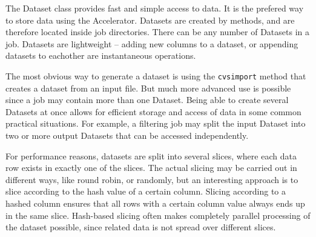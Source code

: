 
\label{chap:datasets}

The Dataset class provides fast and simple access to data.  It is the
prefered way to store data using the Accelerator.  Datasets are
created by methods, and are therefore located inside job directories.
There can be any number of Datasets in a job.  Datasets are
lightweight -- adding new columns to a dataset, or appending datasets
to eachother are instantaneous operations.

The most obvious way to generate a dataset is using the
\texttt{cvsimport} method that creates a dataset from an input file.
But much more advanced use is possible since a job may contain more
than one Dataset.  Being able to create several Datasets at once
allows for efficient storage and access of data in some common
practical situations.  For example, a filtering job may split the
input Dataset into two or more output Datasets that can be accessed
independently.

For performance reasons, datasets are split into several slices, where
each data row exists in exactly one of the slices.  The actual slicing
may be carried out in different ways, like round robin, or randomly,
but an interesting approach is to slice according to the hash value of
a certain column.  Slicing according to a hashed column ensures that
all rows with a certain column value always ends up in the same slice.
Hash-based slicing often makes completely parallel processing of the
dataset possible, since related data is not spread over different
slices.



